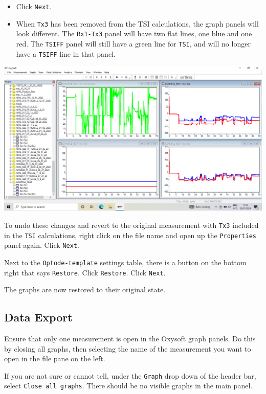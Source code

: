 \documentclass[
]{book}
\providecommand{\tightlist}{%
  \setlength{\itemsep}{0pt}\setlength{\parskip}{0pt}}
\begin{document}
\begin{itemize}
\tightlist
\item
  Click \texttt{Next}.
\item
  When \texttt{Tx3} has been removed from the TSI calculations, the graph panels will look different. The \texttt{Rx1-Tx3} panel will have two flat lines, one blue and one red. The \texttt{TSIFF} panel will still have a green line for \texttt{TSI}, and will no longer have a \texttt{TSIFF} line in that panel.
\end{itemize}

\includegraphics[width=1\linewidth]{images/changemeasurementproperties/view_tsi_graphs}

To undo these changes and revert to the original measurement with \texttt{Tx3} included in the \texttt{TSI} calculations, right click on the file name and open up the \texttt{Properties} panel again. Click \texttt{Next}.

Next to the \texttt{Optode-template} settings table, there is a button on the bottom right that says \texttt{Restore}. Click \texttt{Restore}. Click \texttt{Next}.

The graphs are now restored to their original state.

\hypertarget{PortaMon-DataExport}{%
\subsection{Data Export}\label{PortaMon-DataExport}}

Ensure that only one measurement is open in the Oxysoft graph panels. Do this by closing all graphs, then selecting the name of the measurement you want to open in the file pane on the left.

If you are not sure or cannot tell, under the \texttt{Graph} drop down of the header bar, select \texttt{Close\ all\ graphs}. There should be no visible graphs in the main panel.
\end{document}
